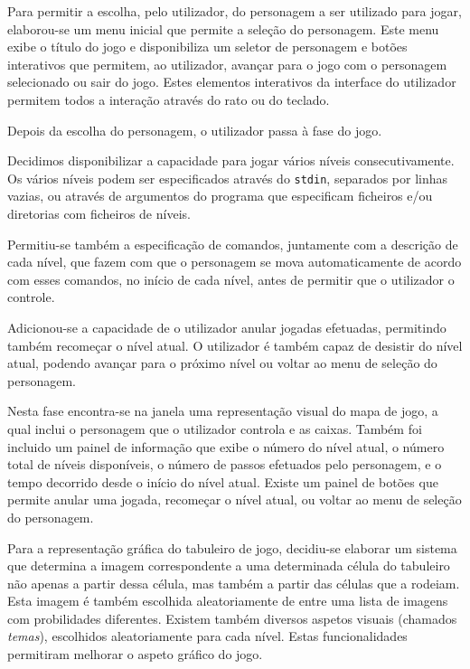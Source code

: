 \documentclass[a4paper]{article}
\begin{document}
Para permitir a escolha, pelo utilizador, do personagem a ser utilizado para jogar, elaborou-se um menu inicial que permite a seleção do personagem. Este menu exibe o título do jogo e disponibiliza um seletor de personagem e botões interativos que permitem, ao utilizador, avançar para o jogo com o personagem selecionado ou sair do jogo. Estes elementos interativos da interface do utilizador permitem todos a interação através do rato ou do teclado.

\bigskip

Depois da escolha do personagem, o utilizador passa à fase do jogo.

Decidimos disponibilizar a capacidade para jogar vários níveis consecutivamente. Os vários níveis podem ser especificados através do \texttt{stdin}, separados por linhas vazias, ou através de argumentos do programa que especificam ficheiros e/ou diretorias com ficheiros de níveis.

Permitiu-se também a especificação de comandos, juntamente com a descrição de cada nível, que fazem com que o personagem se mova automaticamente de acordo com esses comandos, no início de cada nível, antes de permitir que o utilizador o controle.

Adicionou-se a capacidade de o utilizador anular jogadas efetuadas, permitindo também recomeçar o nível atual. O utilizador é também capaz de desistir do nível atual, podendo avançar para o próximo nível ou voltar ao menu de seleção do personagem. 

Nesta fase encontra-se na janela uma representação visual do mapa de jogo, a qual inclui o personagem que o utilizador controla e as caixas. Também foi incluido um painel de informação que exibe o número do nível atual, o número total de níveis disponíveis, o número de passos efetuados pelo personagem, e o tempo decorrido desde o início do nível atual. Existe um painel de botões que permite anular uma jogada, recomeçar o nível atual, ou voltar ao menu de seleção do personagem.

Para a representação gráfica do tabuleiro de jogo, decidiu-se elaborar um sistema que determina a imagem correspondente a uma determinada célula do tabuleiro não apenas a partir dessa célula, mas também a partir das células que a rodeiam. Esta imagem é também escolhida aleatoriamente de entre uma lista de imagens com probilidades diferentes. Existem também diversos aspetos visuais (chamados \emph{temas}), escolhidos aleatoriamente para cada nível. Estas funcionalidades permitiram melhorar o aspeto gráfico do jogo.
\end{document}
